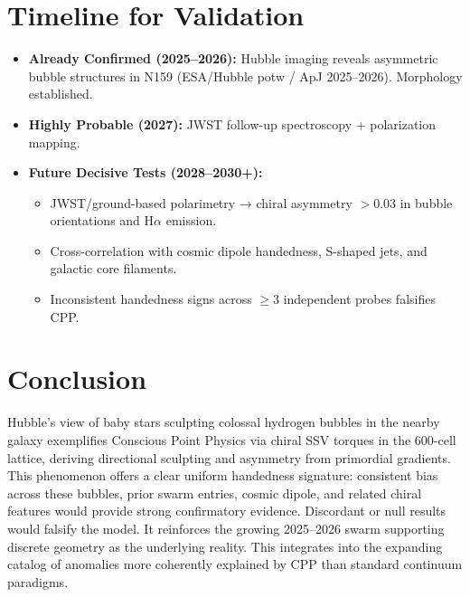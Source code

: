 \documentclass[11pt]{article}
\begin{document}
\section{Timeline for Validation}
\begin{itemize}
    \item \textbf{Already Confirmed (2025--2026):} Hubble imaging reveals asymmetric bubble structures in N159 (ESA/Hubble potw / ApJ 2025--2026). Morphology established.
    \item \textbf{Highly Probable (2027):} JWST follow-up spectroscopy + polarization mapping.
    \item \textbf{Future Decisive Tests (2028--2030+):}
    \begin{itemize}
        \item JWST/ground-based polarimetry → chiral asymmetry $>0.03$ in bubble orientations and H$\alpha$ emission.
        \item Cross-correlation with cosmic dipole handedness, S-shaped jets, and galactic core filaments.
        \item Inconsistent handedness signs across $\geq 3$ independent probes falsifies CPP.
    \end{itemize}
\end{itemize}

\section{Conclusion}
Hubble's view of baby stars sculpting colossal hydrogen bubbles in the nearby galaxy exemplifies Conscious Point Physics via chiral SSV torques in the 600-cell lattice, deriving directional sculpting and asymmetry from primordial gradients.  
This phenomenon offers a clear uniform handedness signature: consistent bias across these bubbles, prior swarm entries, cosmic dipole, and related chiral features would provide strong confirmatory evidence. Discordant or null results would falsify the model. It reinforces the growing 2025--2026 swarm supporting discrete geometry as the underlying reality.  
This integrates into the expanding catalog of anomalies more coherently explained by CPP than standard continuum paradigms.
\end{document}
